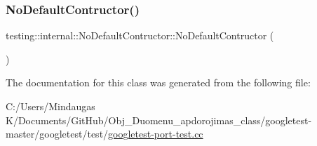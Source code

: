 \subsubsection{\texorpdfstring{NoDefaultContructor()}{NoDefaultContructor()}\hspace{0.1cm}{\footnotesize\ttfamily [6/6]}}
{\footnotesize\ttfamily testing\+::internal\+::\+No\+Default\+Contructor\+::\+No\+Default\+Contructor (\begin{DoxyParamCaption}\item[{const \mbox{\hyperlink{classtesting_1_1internal_1_1_no_default_contructor}{No\+Default\+Contructor}} \&}]{ }\end{DoxyParamCaption})\hspace{0.3cm}{\ttfamily [inline]}}



The documentation for this class was generated from the following file\+:\begin{DoxyCompactItemize}
\item 
C\+:/\+Users/\+Mindaugas K/\+Documents/\+Git\+Hub/\+Obj\+\_\+\+Duomenu\+\_\+apdorojimas\+\_\+class/googletest-\/master/googletest/test/\mbox{\hyperlink{googletest-master_2googletest_2test_2googletest-port-test_8cc}{googletest-\/port-\/test.\+cc}}\end{DoxyCompactItemize}
